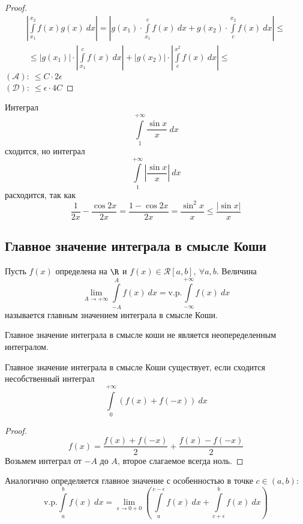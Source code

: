 \begin{proof}
    \begin{multline*}
        \left|\int\limits_{x_1}^{x_2}f(x)g(x)\ dx\right|=\left|g(x_1)\cdot \int\limits_{x_1}^{c}f(x)\ dx+g(x_2)\cdot \int\limits_{c}^{x_2}f(x)\ dx\right|\leq\\\
        \leq |g(x_1)|\cdot \left|\int\limits_{x_1}^{c}f(x)\ dx\right|+|g(x_2)|\cdot \left|\int\limits_{c}^{x^2}f(x)\ dx\right|\leq
    \end{multline*} 
    $(\mathcal{A}):\ \leq C\cdot 2\epsilon$\\
    $(\mathcal{D}):\ \leq \epsilon \cdot 4C$
\end{proof} 
\begin{example} Интеграл 
    \[\int\limits_{1}^{+\infty}\frac{\sin{x}}{x}\ dx\]
    сходится, но интеграл
    \[\int\limits_{1}^{+\infty}\left|\frac{\sin{x}}{x}\right|\ dx\]
    расходится, так как
    \[\frac{1}{2x}-\frac{\cos{2x}}{2x}=\frac{1-\cos{2x}}{2x}=\frac{\sin^2{x}}{x}\leq \frac{|\sin{x}|}{x}\]
\end{example}
\subsection{Главное значение интеграла в смысле Коши}
\begin{definition}
    Пусть $f(x)$ определена на $\R$ и $f(x)\in \mathcal{R}[a,b],\ \forall a,b$. Величина
    \[\lim\limits_{A\to +\infty}\int\limits_{-A}^{A}f(x)\ dx=\text{v.p.} \int\limits_{-\infty}^{+\infty}f(x)\ dx\]
    называется главным значением интеграла в смысле Коши. %
\end{definition} 
\begin{comm}
    Главное значение интеграла в смысле коши не является неопеределенным интегралом.
\end{comm} 
\begin{theorem}
    Главное значение интеграла в смысле Коши существует, если сходится несобственный интеграл
    \[\int\limits_{0}^{+\infty}(f(x)+f(-x))\ dx\]
\end{theorem} 
\begin{proof}
    \[f(x)=\frac{f(x)+f(-x)}{2}+\frac{f(x)-f(-x)}{2}\]
    Возьмем интеграл от $-A$ до $A$, второе слагаемое всегда ноль.
\end{proof} 
\begin{comm}
    Аналогично определяется главное значение с особенностью в точке $c\in (a,b)$:
    \[\text{v.p.}\int\limits_{a}^{b}f(x)\ dx=\lim\limits_{\epsilon\to 0+0}\left(\int\limits_{a}^{c-\epsilon}f(x)\ dx+\int\limits_{c+\epsilon}^{b}f(x)\ dx\right)\]
\end{comm} 